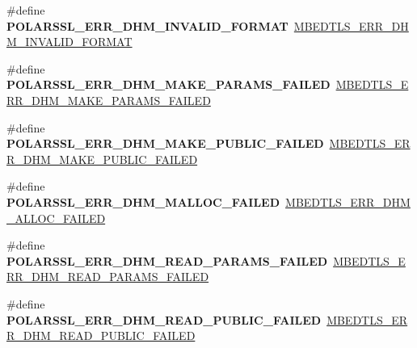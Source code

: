 \begin{DoxyCompactItemize}
\item 
\mbox{\label{compat-1_83_8h_abd146afeae00caff8a5619ae884149db}} 
\#define {\bfseries P\+O\+L\+A\+R\+S\+S\+L\+\_\+\+E\+R\+R\+\_\+\+D\+H\+M\+\_\+\+I\+N\+V\+A\+L\+I\+D\+\_\+\+F\+O\+R\+M\+AT}~\mbox{\hyperlink{dhm_8h_acfa4b3662afd1101c37e07e36b535da3}{M\+B\+E\+D\+T\+L\+S\+\_\+\+E\+R\+R\+\_\+\+D\+H\+M\+\_\+\+I\+N\+V\+A\+L\+I\+D\+\_\+\+F\+O\+R\+M\+AT}}
\item 
\mbox{\label{compat-1_83_8h_a3e27f309924f0bf267c7de08bc6125b5}} 
\#define {\bfseries P\+O\+L\+A\+R\+S\+S\+L\+\_\+\+E\+R\+R\+\_\+\+D\+H\+M\+\_\+\+M\+A\+K\+E\+\_\+\+P\+A\+R\+A\+M\+S\+\_\+\+F\+A\+I\+L\+ED}~\mbox{\hyperlink{dhm_8h_a14e2cef69f706b669ff97924d9f0c393}{M\+B\+E\+D\+T\+L\+S\+\_\+\+E\+R\+R\+\_\+\+D\+H\+M\+\_\+\+M\+A\+K\+E\+\_\+\+P\+A\+R\+A\+M\+S\+\_\+\+F\+A\+I\+L\+ED}}
\item 
\mbox{\label{compat-1_83_8h_a29ed83b8442b715e03990f438d4bce98}} 
\#define {\bfseries P\+O\+L\+A\+R\+S\+S\+L\+\_\+\+E\+R\+R\+\_\+\+D\+H\+M\+\_\+\+M\+A\+K\+E\+\_\+\+P\+U\+B\+L\+I\+C\+\_\+\+F\+A\+I\+L\+ED}~\mbox{\hyperlink{dhm_8h_a4f6a753b182c2967f4c461d35cd00af3}{M\+B\+E\+D\+T\+L\+S\+\_\+\+E\+R\+R\+\_\+\+D\+H\+M\+\_\+\+M\+A\+K\+E\+\_\+\+P\+U\+B\+L\+I\+C\+\_\+\+F\+A\+I\+L\+ED}}
\item 
\mbox{\label{compat-1_83_8h_ac3d150ca9ea33ba5355738f56907907c}} 
\#define {\bfseries P\+O\+L\+A\+R\+S\+S\+L\+\_\+\+E\+R\+R\+\_\+\+D\+H\+M\+\_\+\+M\+A\+L\+L\+O\+C\+\_\+\+F\+A\+I\+L\+ED}~\mbox{\hyperlink{dhm_8h_ab41c35f09ac9121671a51d057d06d726}{M\+B\+E\+D\+T\+L\+S\+\_\+\+E\+R\+R\+\_\+\+D\+H\+M\+\_\+\+A\+L\+L\+O\+C\+\_\+\+F\+A\+I\+L\+ED}}
\item 
\mbox{\label{compat-1_83_8h_a1cf5b743957392157fefae2d1ceef39f}} 
\#define {\bfseries P\+O\+L\+A\+R\+S\+S\+L\+\_\+\+E\+R\+R\+\_\+\+D\+H\+M\+\_\+\+R\+E\+A\+D\+\_\+\+P\+A\+R\+A\+M\+S\+\_\+\+F\+A\+I\+L\+ED}~\mbox{\hyperlink{dhm_8h_aeda9c1e986e7602a7aecd7aab670c765}{M\+B\+E\+D\+T\+L\+S\+\_\+\+E\+R\+R\+\_\+\+D\+H\+M\+\_\+\+R\+E\+A\+D\+\_\+\+P\+A\+R\+A\+M\+S\+\_\+\+F\+A\+I\+L\+ED}}
\item 
\mbox{\label{compat-1_83_8h_a54e3f55659f632b8cce3159f113ee009}} 
\#define {\bfseries P\+O\+L\+A\+R\+S\+S\+L\+\_\+\+E\+R\+R\+\_\+\+D\+H\+M\+\_\+\+R\+E\+A\+D\+\_\+\+P\+U\+B\+L\+I\+C\+\_\+\+F\+A\+I\+L\+ED}~\mbox{\hyperlink{dhm_8h_a8e6f0e88a0c1865c8d4cbe576ee7a5fb}{M\+B\+E\+D\+T\+L\+S\+\_\+\+E\+R\+R\+\_\+\+D\+H\+M\+\_\+\+R\+E\+A\+D\+\_\+\+P\+U\+B\+L\+I\+C\+\_\+\+F\+A\+I\+L\+ED}}

\end{DoxyCompactItemize}
